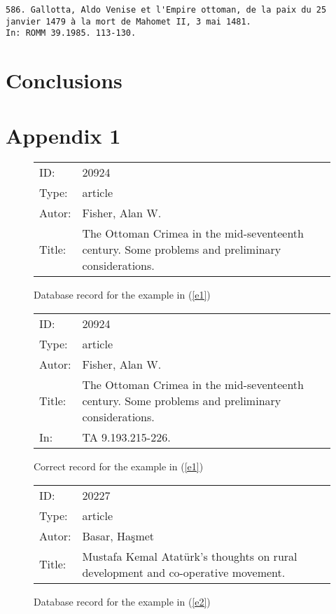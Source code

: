 \documentclass{scrartcl}
\begin{document}
\begin{example}
\begin{verbatim}
586. Gallotta, Aldo Venise et l'Empire ottoman, de la paix du 25
janvier 1479 à la mort de Mahomet II, 3 mai 1481. 
In: ROMM 39.1985. 113-130.
\end{verbatim}
\label{e7} 
\end{example}


\section{Conclusions} 

\section*{Appendix 1}

\begin{figure}[ht]
\begin{tabular}{|p{}p{}|}
ID:&  	20924\\
Type:& 	article\\
Autor:& 	Fisher, Alan W.\\
Title:& 	The Ottoman Crimea in the mid-seventeenth century. Some problems and
preliminary considerations.
\end{tabular}
\caption{Database record for the example in (\ref{e1}) \label{e1:f1}}
\end{figure} 

\begin{figure}[ht]
\begin{tabular}{|p{}p{}|}
ID:&  	20924\\
Type:& 	article\\
Autor:& 	Fisher, Alan W.\\
Title:& 	The Ottoman Crimea in the mid-seventeenth century. Some problems and
preliminary considerations.\\
In:& TA 9.193.215-226. 	
\end{tabular}
\caption{Correct record for the example in (\ref{e1}) \label{e1:f2}}
\end{figure}

\begin{figure}[ht]
\begin{tabular}{|p{}p{}|}
ID:  	&20227\\
Type: 	&article\\
Autor: 	&Basar, Haşmet\\
Title: 	&Mustafa Kemal Atatürk's thoughts on rural development and co-operative
movement.
\end{tabular}
\caption{Database record for the example in (\ref{e2}) \label{e2:f1}}
\end{figure} 
\end{document}

